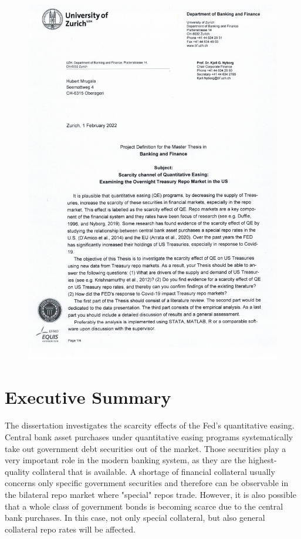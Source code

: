 \documentclass[11pt,a4paper,english,oneside]{article}
\begin{document}
\begin{figure}[h!]
  \begin{center}
    \includegraphics[page=4,width=.86\textwidth]{../../project_definition.pdf}
  \end{center}
\end{figure}

\thispagestyle{firststyle}
\newpage

\section*{Executive Summary}
\thispagestyle{firststyle}

The dissertation investigates the scarcity effects of the Fed's quantitative easing. Central bank asset purchases under quantitative easing programs systematically take out government debt securities out of the market. Those securities play a very important role in the modern banking system, as they are the highest-quality collateral that is available. A shortage of financial collateral usually concerns only specific government securities and therefore can be observable in the bilateral repo market where "special" repos trade. However, it is also possible that a whole class of government bonds is becoming scarce due to the central bank purchases. In this case, not only special collateral, but also general collateral repo rates will be affected.
\end{document}
